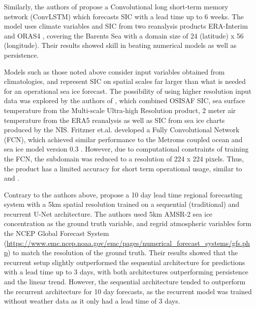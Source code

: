 \documentclass[../main/thesis.tex]{subfiles}
\begin{document}
Similarly, the authors of \cite{Liu2021} propose a Convolutional long short-term memory network (ConvLSTM) which forecasts SIC with a lead time up to 6 weeks. The model uses climate variables and SIC from two reanalysis products ERA-Interim \cite{Dee2011} and ORAS4 \cite{Balmaseda2013}, covering the Barents Sea with a domain size of 24 (latitude) x 56 (longitude). Their results showed skill in beating numerical models as well as persistence. 

Models such as those noted above consider input variables obtained from climatologies, and represent SIC on spatial scales far larger than what is needed for an operational sea ice forecast. The possibility of using higher resolution input data was explored by the authors of \cite{Fritzner2020}, which combined OSISAF SIC, sea surface temperature from the Multi-scale Ultra-high Resolution product, 2 meter air temperature from the ERA5 reanalysis as well as SIC from sea ice charts produced by the NIS. Fritzner et.al. developed a Fully Convolutional Network (FCN), which achieved similar performance to the Metroms coupled ocean and sea ice model version 0.3 \cite{Kristensen2017}. However, due to computational constraints of training the FCN, the subdomain was reduced to a resolution of 224 x 224 pixels. Thus, the product has a limited accuracy for short term operational usage, similar to \cite{Andersson2021} and \cite{Liu2021}.

Contrary to the authors above, \cite{Grigoryev2022} propose a 10 day lead time regional forecasting system with a 5km spatial resolution trained on a sequential (traditional) and recurrent U-Net architecture. The authors used 5km AMSR-2 sea ice concentration as the ground truth variable, and regrid atmospheric variables form the NCEP Global Forecast System (\url{https://www.emc.ncep.noaa.gov/emc/pages/numerical_forecast_systems/gfs.php}) to match the resolution of the ground truth. Their results showed that the recurrent setup slightly outperformed the sequential architecture for predictions with a lead time up to 3 days, with both architectures outperforming persistence and the linear trend. However, the sequential architecture tended to outperform the recurrent architecture for 10 day forecasts, as the recurrent model was trained without weather data as it only had a lead time of 3 days.
\end{document}
